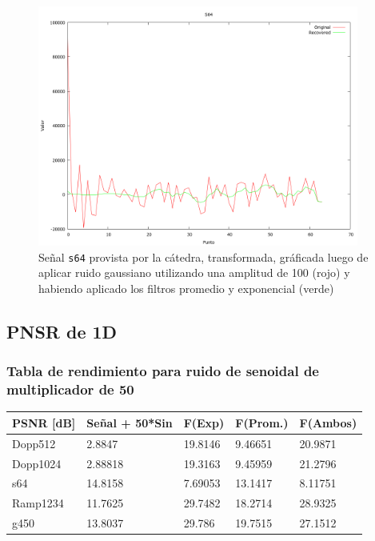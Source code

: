 \begin{figure}
\begin {center}
\includegraphics[width=299pt]{imagenes/s64-gauss100-both-spec.png}
\end {center}
\caption{Se\~nal \texttt{s64} provista por la c\'atedra, transformada, gr\'aficada
luego de aplicar ruido gaussiano utilizando una amplitud de 100 (rojo) y 
habiendo aplicado los filtros promedio y exponencial (verde)}
\label{fig:SinProm}
\end{figure}

\subsection{PNSR de 1D}
\subsubsection{Tabla de rendimiento para ruido de senoidal de multiplicador de 50}

\begin{table}[H]
        \begin{tabular}{|l|llll|}
                \hline
                \textbf{PSNR [dB]} & Se\~nal + 50*Sin & F(Exp) & F(Prom.) & F(Ambos) \\ \hline
                    Dopp512 & 2.8847 & 19.8146 & 9.46651 & 20.9871 \\
                    Dopp1024 & 2.88818 & 19.3163 & 9.45959 & 21.2796 \\
                    s64 & 14.8158 & 7.69053 & 13.1417 & 8.11751 \\
                    Ramp1234 & 11.7625 & 29.7482 & 18.2714 & 28.9325 \\
                    g450 & 13.8037 & 29.786 & 19.7515 & 27.1512 \\ \hline
                    \end{tabular}
                \end{table}

